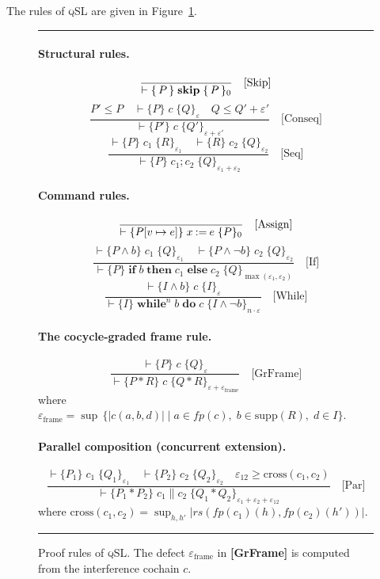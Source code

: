 \documentclass[acmsmall,sigplan,anonymous,review,screen]{acmart}
\newcommand{\inferrule}[2]{%
  \dfrac{\displaystyle #1}{\displaystyle #2}%
}
\theoremstyle{plain}
\theoremstyle{definition}
\newcommand{\qSL}{\textsc{qSL}\xspace}
\newcommand{\rs}{\mathit{rs}}
\newcommand{\fp}{\mathit{fp}}
\newcommand{\sep}{*}
\newcommand{\defect}{\varepsilon}
\begin{document}
The rules of \qSL are given in Figure~\ref{fig:rules}.

\begin{figure}[t]
  \hrule\smallskip
  \paragraph{Structural rules.}
  \[
    \inferrule{ }{\vdash \{\,P\,\}\;\mathbf{skip}\;\{\,P\,\}_0}
    \quad\text{[Skip]}
  \]
  \[
    \inferrule{P' \leq P \quad \vdash \{P\}\;c\;\{Q\}_\defect \quad Q \leq Q' + \defect'}
              {\vdash \{P'\}\;c\;\{Q'\}_{\defect + \defect'}}
    \quad\text{[Conseq]}
  \]
  \[
    \inferrule{\vdash \{P\}\;c_1\;\{R\}_{\defect_1} \quad \vdash \{R\}\;c_2\;\{Q\}_{\defect_2}}
              {\vdash \{P\}\;c_1;c_2\;\{Q\}_{\defect_1+\defect_2}}
    \quad\text{[Seq]}
  \]

  \paragraph{Command rules.}
  \[
    \inferrule{ }{\vdash \{P[v \mapsto e]\}\;x \mathbin{:=} e\;\{P\}_0}
    \quad\text{[Assign]}
  \]
  \[
    \inferrule{\vdash \{P \land b\}\;c_1\;\{Q\}_{\defect_1} \quad
               \vdash \{P \land \neg b\}\;c_2\;\{Q\}_{\defect_2}}
              {\vdash \{P\}\;\mathbf{if}\;b\;\mathbf{then}\;c_1\;\mathbf{else}\;c_2\;\{Q\}_{\max(\defect_1,\defect_2)}}
    \quad\text{[If]}
  \]
  \[
    \inferrule{\vdash \{I \land b\}\;c\;\{I\}_{\defect}}
              {\vdash \{I\}\;\mathbf{while}^n\;b\;\mathbf{do}\;c\;\{I \land \neg b\}_{n \cdot \defect}}
    \quad\text{[While]}
  \]

  \paragraph{The cocycle-graded frame rule.}
  \[
    \inferrule{\vdash \{P\}\;c\;\{Q\}_\defect}
              {\vdash \{P \sep R\}\;c\;\{Q \sep R\}_{\defect + \defect_{\mathrm{frame}}}}
    \quad\text{[GrFrame]}
  \]
  where
  $\defect_{\mathrm{frame}} = \sup\,\{|c(a, b, d)| \mid a \in \fp(c),\;
  b \in \mathrm{supp}(R),\; d \in I\}$.\smallskip

  \paragraph{Parallel composition (concurrent extension).}
  \[
    \inferrule{\vdash \{P_1\}\;c_1\;\{Q_1\}_{\defect_1} \quad \vdash \{P_2\}\;c_2\;\{Q_2\}_{\defect_2}
               \quad \defect_{12} \geq \mathrm{cross}(c_1, c_2)}
              {\vdash \{P_1 \sep P_2\}\;c_1 \| c_2\;\{Q_1 \sep Q_2\}_{\defect_1 + \defect_2 + \defect_{12}}}
    \quad\text{[Par]}
  \]
  where $\mathrm{cross}(c_1, c_2) = \sup_{h,h'} |\rs(\fp(c_1)(h), \fp(c_2)(h'))|$.\medskip
  \hrule
  \caption{Proof rules of \qSL.  The defect $\defect_{\mathrm{frame}}$ in
    \textbf{[GrFrame]} is computed from the interference cochain $c$.}
  \label{fig:rules}
\end{figure}
\end{document}
